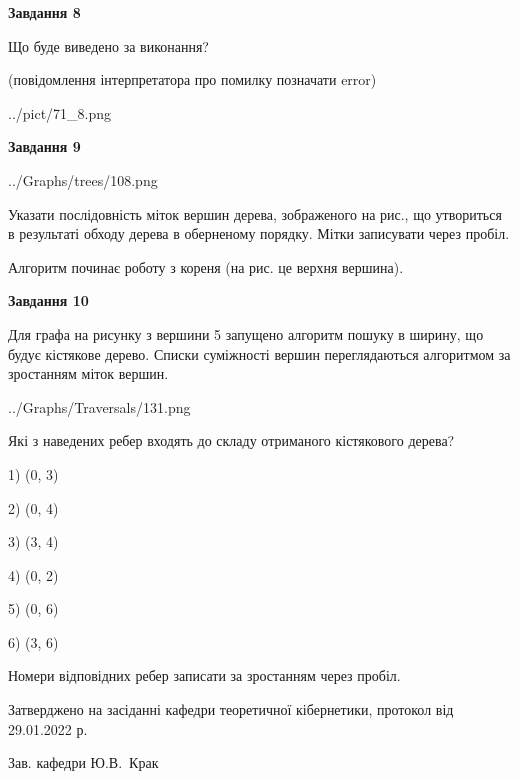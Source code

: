 \documentclass[12pt, ukrainian]{article}
\begin{document}
{\begin {large}
{\begin {center}\textbf{Завдання 8}\end {center}}\par
Що буде виведено за виконання?\par
 (повідомлення інтерпретатора про помилку позначати error)\par
\begin{center}
	{../pict/71_8.png}
\end{center}
\newpage

{\begin {center}\textbf{Завдання 9}\end {center}}\par

\begin{center}
	{../Graphs/trees/108.png}
\end{center}
Указати послідовність міток вершин дерева, зображеного на рис., що утвориться в результаті обходу дерева в оберненому порядку. Мітки записувати через пробіл.\par Алгоритм починає роботу з кореня (на рис. це верхня вершина).\par
\newpage

{\begin {center}\textbf{Завдання 10}\end {center}}\par
Для графа на рисунку з вершини 5 запущено алгоритм пошуку в ширину, що будує кістякове дерево. Списки суміжності вершин переглядаються алгоритмом за зростанням міток вершин.\par
\begin{center}
	{../Graphs/Traversals/131.png}
\end{center}
\par Які з наведених ребер входять до складу отриманого кістякового дерева?\par
1) (0, 3)\par
2) (0, 4)\par
3) (3, 4)\par
4) (0, 2)\par
5) (0, 6)\par
6) (3, 6)\par
{\vskip 15pt} Номери відповідних ребер записати за зростанням через пробіл.\par
\newpage


\end {large}
}
{\smallskip \begin {small} Затверджено на засіданні кафедри теоретичної кібернетики, протокол  від   29.01.2022 р.\par\smallskip\smallskip
{\parbox {6.5 cm}{Зав. кафедри \dotfill Ю.В.~Крак}} \end{small}}
\end{document}
